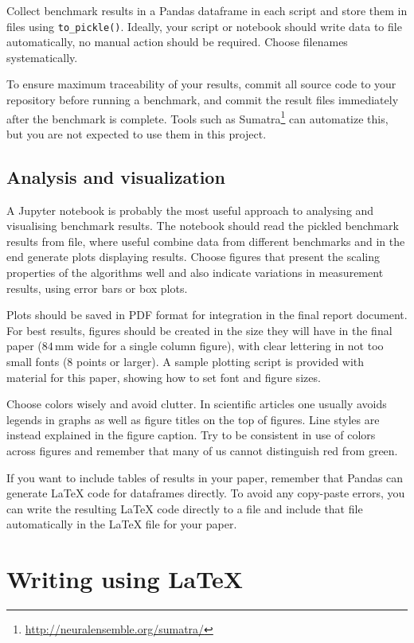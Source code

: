 \documentclass[sigconf, nonacm, natbib, screen, balance=False]{acmart}
\begin{document}
Collect benchmark results in a Pandas dataframe in each script and
store them in files using \verb!to_pickle()!.  Ideally, your script or
notebook should write data to file automatically, no manual action
should be required. Choose filenames systematically.

To ensure maximum traceability of your results, commit all
source code to your repository before running a benchmark, and commit
the result files immediately after the benchmark is complete. Tools
such as Sumatra\footnote{\url{http://neuralensemble.org/sumatra/}}
\cite{Davi_2012_48} can automatize this, but you are not expected to
use them in this project.
  
\subsection{Analysis and visualization}\label{sec:analysis}

A Jupyter notebook is probably the most useful approach to analysing
and visualising benchmark results. The notebook should read the
pickled benchmark results from file, where useful combine data from
different benchmarks and in the end generate plots displaying
results. Choose figures that present the scaling properties of the
algorithms well and also indicate variations in measurement results,
using error bars or box plots.

Plots should be saved in PDF format for integration in the final
report document. For best results, figures should be created in the
size they will have in the final paper ($84\,\text{mm}$ wide for a
single column figure), with clear lettering in not too small fonts (8
points or larger). A sample plotting script is provided with material
for this paper, showing how to set font and figure sizes.

Choose colors wisely and avoid clutter. In scientific articles one
usually avoids legends in graphs as well as figure titles on the top
of figures. Line styles are instead explained in the figure
caption. Try to be consistent in use of colors across figures and
remember that many of us cannot distinguish red from green.

If you want to include tables of results in your paper, remember that
Pandas can generate \LaTeX{} code for dataframes directly. To avoid
any copy-paste errors, you can write the resulting \LaTeX{} code
directly to a file and include that file automatically in the \LaTeX{}
file for your paper.


\section{Writing using \LaTeX}\label{sec:tex}
\end{document}
